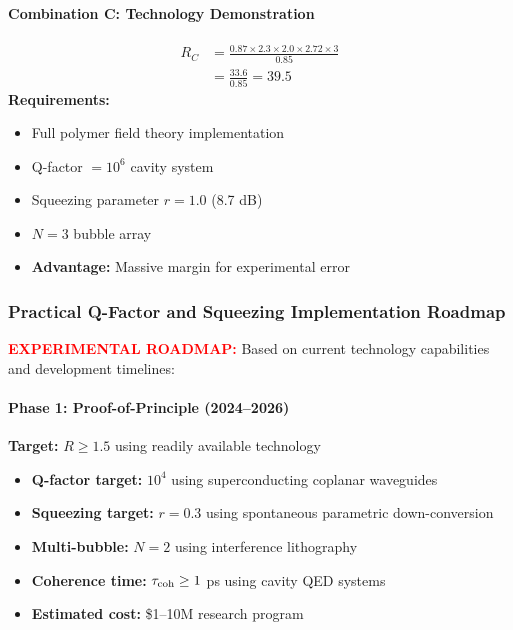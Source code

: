\documentclass[11pt]{article}
\begin{document}
{\paragraph{Combination C: Technology Demonstration}
\begin{align*}
  R_C &= \frac{0.87 \times 2.3 \times 2.0 \times 2.72 \times 3}{0.85} \\
  &= \frac{33.6}{0.85} = 39.5
\end{align*}
\textbf{Requirements:}
\begin{itemize}
  \item Full polymer field theory implementation
  \item Q-factor $= 10^6$ cavity system
  \item Squeezing parameter $r = 1.0$ (8.7 dB)
  \item $N = 3$ bubble array
  \item \textbf{Advantage:} Massive margin for experimental error
\end{itemize}

\subsubsection*{Practical Q-Factor and Squeezing Implementation Roadmap}
\textcolor{red}{\textbf{EXPERIMENTAL ROADMAP:}} Based on current technology capabilities and development timelines:

\paragraph{Phase 1: Proof-of-Principle (2024--2026)}
\textbf{Target:} $R \geq 1.5$ using readily available technology
\begin{itemize}
  \item \textbf{Q-factor target:} $10^4$ using superconducting coplanar waveguides
  \item \textbf{Squeezing target:} $r = 0.3$ using spontaneous parametric down-conversion
  \item \textbf{Multi-bubble:} $N = 2$ using interference lithography
  \item \textbf{Coherence time:} $\tau_{\rm coh} \geq 1$ ps using cavity QED systems
  \item \textbf{Estimated cost:} \$1--10M research program
\end{itemize}

}
\end{document}
